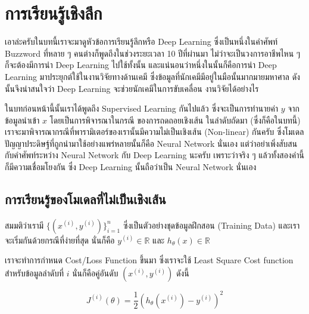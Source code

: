 

\chapter{การเรียนรู้เชิงลึก}
\label{ch:dl}

เอาล่ะครับในบทนี้เราจะมาดูหัวข้อการเรียนรู้ลึกหรือ Deep Learning ซึ่งเป็นหนึ่งในคำศัพท์ Buzzword ที่หลาย ๆ คนต่างก็พูดถึงในช่วงระยะเวลา
10 ปีที่ผ่านมา ไม่ว่าจะเป็นวงการอาชีพไหน ๆ ก็จะต้องมีการนำ Deep Learning ไปใช้ทั้งนั้น และแน่นอนว่าหนึ่งในนั้นก็คือการนำ Deep Learning 
มาประยุกต์ใช้ในงานวิจัยทางด้านเคมี ซึ่งข้อมูลที่นักเคมีมีอยู่ในมือนั้นมากมายมหาศาล ดังนั้นจึงน่าสนใจว่า Deep Learning จะช่วยนักเคมีในการขับเคลื่อน%
งานวิจัยได้อย่างไร

ในบทก่อนหน้านี้นั้นเราได้พูดถึง Supervised Learning กันไปแล้ว ซึ่งจะเป็นการทำนายค่า $y$ จากข้อมูลนำเข้า $x$ โดยเป็นการพิจารณาในกรณี%
ของการถดถอยเชิงเส้น ในลำดับถัดมา (ซึ่งก็คือในบทนี้) เราจะมาพิจารณากรณีที่พารามิเตอร์ของเรานั้นมีความไม่เป็นเชิงเส้น (Non-linear) กันครับ
ซึ่งโมเดลปัญญาประดิษฐ์ที่ถูกนำมาใช้อย่างแพร่หลายนั้นก็คือ Neural Network นั่นเอง แต่ว่าอย่าเพิ่งสับสนกับคำศัพท์ระหว่าง Neural Network กับ
Deep Learning นะครับ เพราะว่าจริง ๆ แล้วทั้งสองคำนี้ก็มีความเชื่อมโยงกัน ซึ่ง Deep Learning นั้นถือว่าเป็น Neural Network นั่นเอง

\section{การเรียนรู้ของโมเดลที่ไม่เป็นเชิงเส้น}
\label{sec:nonlinear_ml}

สมมติว่าเรามี $\{(x^{(i)}, y^{(i)})\}^n_{i=1}$ ซึ่งเป็นตัวอย่างชุดข้อมูลฝึกสอน (Training Data) และเราจะเริ่มกันด้วยกรณีที่ง่ายที่สุด%
นั่นก็คือ $y^{(i)} \in \mathbb{R}$ และ $h_\theta(x) \in \mathbb{R}$ 

เราจะทำการกำหนด Cost/Loss Function ขึ้นมา ซึ่งเราจะใช้ Least Square Cost function สำหรับข้อมูลลำดับที่ $i$ นั่นก็คือคู่อันดับ 
$(x^{(i)} ,y^{(i)} )$ ดังนี้ 

\begin{equation}\label{eq:loss}
    J^{(i)} (\theta) = \frac{1}{2} \left(h_\theta (x^{(i)}) - y^{(i)}\right)^2
\end{equation}


